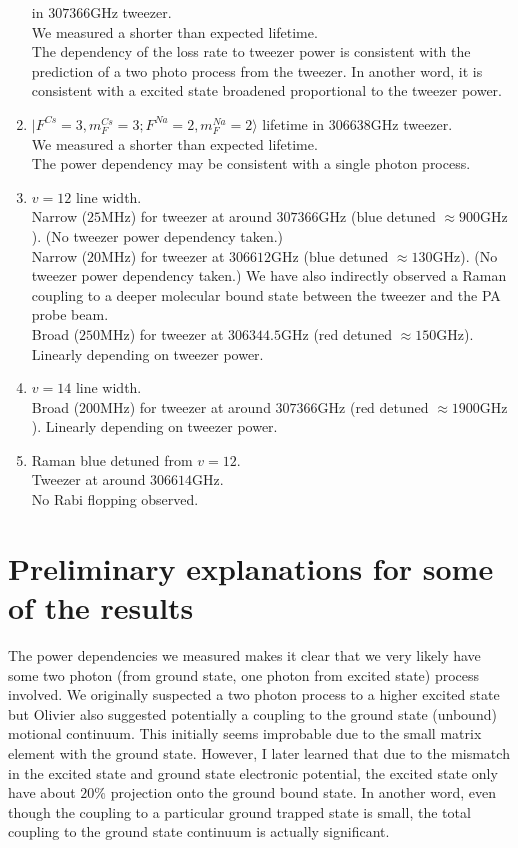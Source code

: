 \documentclass[10pt,fleqn]{article}
\begin{document}
\begin{enumerate}
  in $307366 \mathrm{GHz}$ tweezer.\\
  We measured a shorter than expected lifetime.\\
  The dependency of the loss rate to tweezer power is consistent with the prediction of
  a two photo process from the tweezer. In another word, it is consistent with
  a excited state broadened proportional to the tweezer power.
\item $|F^{Cs}=3, m_{F}^{Cs}=3; F^{Na}=2, m_{F}^{Na}=2\rangle$ lifetime
  in $306638 \mathrm{GHz}$ tweezer.\\
  We measured a shorter than expected lifetime.\\
  The power dependency may be consistent with a single photon process.
\item $v=12$ line width.\\
  Narrow ($25 \mathrm{MHz}$) for tweezer at around $307366 \mathrm{GHz}$
  (blue detuned $\approx 900\mathrm{GHz}$). (No tweezer power dependency taken.)\\
  Narrow ($20 \mathrm{MHz}$) for tweezer at $306612 \mathrm{GHz}$
  (blue detuned $\approx 130\mathrm{GHz}$). (No tweezer power dependency taken.)
  We have also indirectly observed a Raman coupling to a deeper molecular bound state
  between the tweezer and the PA probe beam.\\
  Broad ($250 \mathrm{MHz}$) for tweezer at $306344.5 \mathrm{GHz}$
  (red detuned $\approx 150\mathrm{GHz}$). Linearly depending on tweezer power.\\
\item $v=14$ line width.\\
  Broad ($200 \mathrm{MHz}$) for tweezer at around $307366 \mathrm{GHz}$
  (red detuned $\approx 1900\mathrm{GHz}$). Linearly depending on tweezer power.\\
\item Raman blue detuned from $v=12$.\\
  Tweezer at around $306614 \mathrm{GHz}$.\\
  No Rabi flopping observed.
\end{enumerate}

\section{Preliminary explanations for some of the results}
The power dependencies we measured makes it clear that we very likely
have some two photon (from ground state, one photon from excited state) process involved.
We originally suspected a two photon process to a higher excited state but Olivier also
suggested potentially a coupling to the ground state (unbound) motional continuum.
This initially seems improbable due to the small matrix element with the ground state.
However, I later learned that due to the mismatch in the excited state and ground state
electronic potential, the excited state only have about $20\%$ projection onto the ground
bound state. In another word, even though the coupling to a particular ground trapped
state is small, the total coupling to the ground state continuum is actually significant.\\
\end{document}
